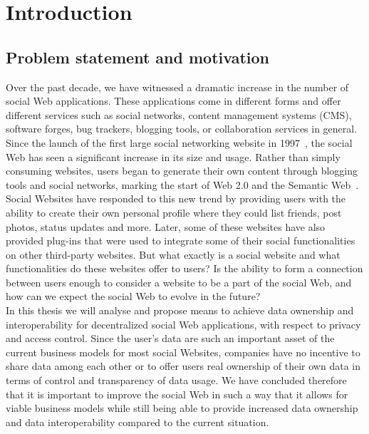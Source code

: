 \chapter{Introduction}
\label{ch:intro}
\setcounter{page}{1}

\section{Problem statement and motivation}
\label{sec:statement}
Over the past decade, we have witnessed a dramatic increase in the number of social Web applications. These applications come in different forms and offer different services such as social networks, content management systems (CMS), software forges, bug trackers, blogging tools, or collaboration services in general.\\

Since the launch of the first large social networking website in 1997~\cite{ellison2007social}, the social Web has seen a significant increase in its size and usage. Rather than simply consuming websites, users began to generate their own content through blogging tools and social networks, marking the start of Web 2.0 and the Semantic Web~\cite{berners1999weaving}. Social Websites have responded to this new trend by providing users with the ability to create their own personal profile where they could list friends, post photos, status updates and more. Later, some of these websites have also provided plug-ins that were used to integrate some of their social functionalities on other third-party websites. But what exactly is a social website and what functionalities do these websites offer to users? Is the ability to form a connection between users enough to consider a website to be a part of the social Web, and how can we expect the social Web to evolve in the future?\\

In this thesis we will analyse and propose means to achieve data ownership and interoperability for decentralized social Web applications, with respect to privacy and access control. Since the user's data are such an important asset of the current business models for most social Websites, companies have no incentive to share data among each other or to offer users real ownership of their own data in terms of control and transparency of data usage. We have concluded therefore that it is important to improve the social Web in such a way that it allows for viable business models while still being able to provide increased data ownership and data interoperability compared to the current situation.\\

